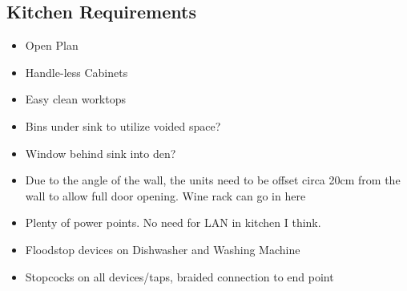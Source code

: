 \subsection{Kitchen Requirements}
\begin{itemize}
\item Open Plan
\item Handle-less Cabinets
\item Easy clean worktops
\item Bins under sink to utilize voided space?
\item Window behind sink into den?
\item Due to the angle of the wall, the units need to be offset circa 20cm from the wall to allow full door opening. Wine rack can go in here
\item Plenty of power points. No need for LAN in kitchen I think.    
\item Floodstop devices on Dishwasher and Washing Machine 
\item Stopcocks on all devices/taps, braided connection to end point 
\end{itemize}
